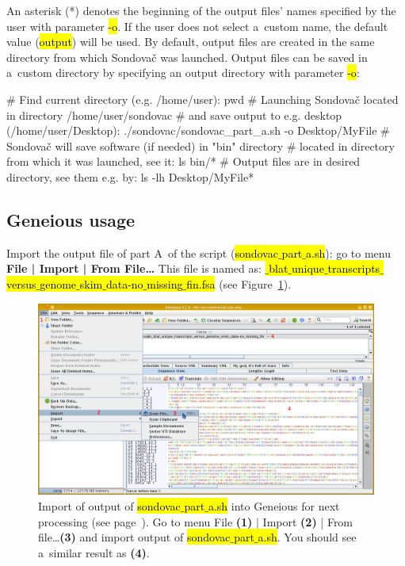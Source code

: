 \documentclass[a4paper, 11pt, twoside]{article}
\renewcommand{\texttt}[1]{\hl{\ttfamily #1}}
\begin{document}
An asterisk (*) denotes the beginning of the output files' names specified by the user with parameter \texttt{-o}. If the user does not select a~custom name, the default value (\texttt{output}) will be used. By default, output files are created in the same directory from which Sondovač was launched. Output files can be saved in a~custom directory by specifying an output directory with parameter \texttt{-o}:

\begin{bashcode}
  # Find current directory (e.g. /home/user):
  pwd
  # Launching Sondovač located in directory /home/user/sondovac
  # and save output to e.g. desktop (/home/user/Desktop):
  ./sondovac/sondovac_part_a.sh -o Desktop/MyFile
  # Sondovač will save software (if needed) in "bin" directory
  # located in directory from which it was launched, see it:
  ls bin/*
  # Output files are in desired directory, see them e.g. by:
  ls -lh Desktop/MyFile*
\end{bashcode}

\subsection{Geneious usage}
\label{geneious-usage}

Import the output file of part A~of the script (\texttt{sondovac$\_$part$\_$a.sh}): go to menu \textbf{File | Import | From File\ldots} This file is named as: \texttt{*$\_$blat$\_$unique$\_$transcripts$\_$versus$\_$genome$\_$skim$\_$data\--no$\_$missing$\_$fin.fsa} (see Figure~\ref{geneious-import}).

\begin{figure}[hbt]
  \includegraphics[width=\textwidth]{geneious1.png}
  \caption[Import into Geneious]{Import of output of \texttt{sondovac$\_$part$\_$a.sh} into Geneious for next processing (see page~\pageref{pipeline-overview}). Go to menu File \textbf{(1)} | Import \textbf{(2)} | From file\ldots \textbf{(3)} and import output of \texttt{sondovac$\_$part$\_$a.sh}. You should see a~similar result as \textbf{(4)}.}
  \label{geneious-import}
\end{figure}
\end{document}
